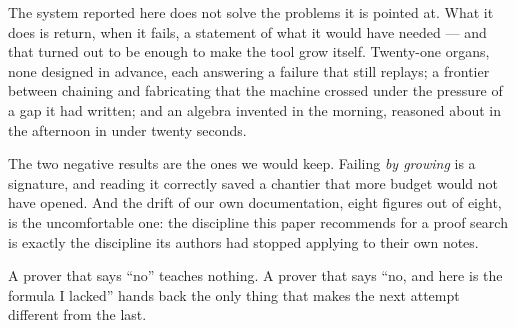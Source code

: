 \documentclass[11pt]{article}
\theoremstyle{remark}\newtheorem{remark}{Remark}
\begin{document}
The system reported here does not solve the problems it is pointed at. What it does is
return, when it fails, a statement of what it would have needed --- and that turned out to
be enough to make the tool grow itself. Twenty-one organs, none designed in advance, each
answering a failure that still replays; a frontier between chaining and fabricating that
the machine crossed under the pressure of a gap it had written; and an algebra invented in
the morning, reasoned about in the afternoon in under twenty seconds.

The two negative results are the ones we would keep. Failing \emph{by growing} is a
signature, and reading it correctly saved a chantier that more budget would not have
opened. And the drift of our own documentation, eight figures out of eight, is the
uncomfortable one: the discipline this paper recommends for a proof search is exactly the
discipline its authors had stopped applying to their own notes.

A prover that says ``no'' teaches nothing. A prover that says ``no, and here is the
formula I lacked'' hands back the only thing that makes the next attempt different from
the last.



\end{document}
